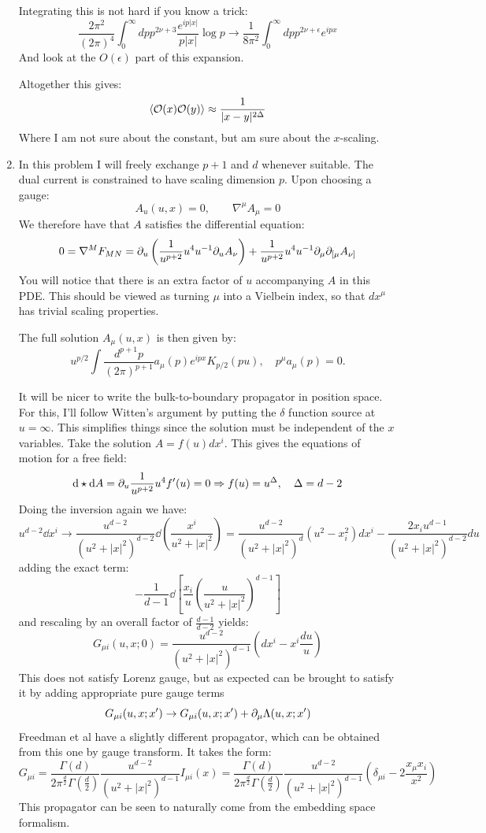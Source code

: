 \documentclass[11pt, class=article, crop=false]{standalone}
\begin{document}
\begin{enumerate}
	Integrating this is not hard if you know a trick:
	\[
		\frac{2 \pi^2}{(2\pi)^4} \int_0^\infty dp p^{2 \nu + 3} \frac{e^{i p |x|}}{p|x|} \log p \to \frac{1}{8\pi^2} \int_0^\infty dp p^{2 \nu + \epsilon} e^{i p x} 
	\]
	And look at the $O(\epsilon)$ part of this expansion. 
	
	Altogether this gives:
	\[
		\braket{\mathcal{O}(x) \mathcal{O}(y)} \approx \frac{1}{|x-y|^{2 \Delta}}
	\]
	Where I am not sure about the constant, but am sure about the $x$-scaling. %
	
	\item In this problem I will freely exchange $p+1$ and $d$ whenever suitable. The dual current is constrained to have scaling dimension $p$. Upon choosing a gauge:
	\[
		A_u(u, x) = 0, \qquad \nabla^\mu A_\mu = 0
	\]
	We therefore have that $A$ satisfies the differential equation:
	\[
		0 = \nabla^M F_{MN} = \partial_u \left(\frac{1}{u^{p+2}} u^4 u^{-1} \partial_u A_\nu \right) + \frac{1}{u^{p+2}} u^4 u^{-1} \partial_\mu \partial_{[\mu} A_{\nu]}
	\]
	You will notice that there is an extra factor of $u$ accompanying $A$ in this PDE. This should be viewed as turning $\mu$ into a Vielbein index, so that $dx^\mu$ has trivial scaling properties. 
	
	The full solution $A_\mu (u, x)$ is then given by:
	\[
		u^{p/2} \int \frac{d^{p+1} p}{(2\pi)^{p+1}} a_\mu (p) e^{i p x} K_{p/2}(p u), \quad p^\mu a_\mu(p) = 0.
	\]
	
	
	It will be nicer to write the bulk-to-boundary propagator in position space. For this, I'll follow Witten's argument by putting the $\delta$ function source at $u = \infty$. This simplifies things since the solution must be independent of the $x$ variables. Take the solution $A= f(u) dx^i$. This gives the equations of motion for a free field:
	\[
		\mathrm{d} \star \mathrm{d} A = \partial_u \frac{1}{u^{p+2}} u^4 f'(u) = 0 \Rightarrow f(u) = u^\Delta, \quad \Delta = d-2
	\]
	Doing the inversion again we have:
	\[
		u^{d-2} \dd x^i \to \frac{u^{d-2}}{(u^2 + |x|^2)^{d-2}} \dd\left(\frac{x^i}{u^2 + |x|^2} \right)=  \frac{u^{d-2}}{(u^2 + |x|^2)^{d}} (u^2 - x_i^2) dx^i - \frac{2 x_i u^{d-1}}{(u^2 + |x|^2)^{d-2}} du
	\]
	adding the exact term:
	\[
		- \frac{1}{d-1} \dd \left[\frac{x_i}{u} \left(\frac{u}{u^2 + |x|^2} \right)^{d-1} \right]
	\]
	and rescaling by an overall factor of $\frac{d-1}{d-2}$ yields:
	\begin{equation}\label{eq:vectorprop}
		G_{\mu i}(u, x; 0) = \frac{u^{d-2}}{(u^2 + |x|^2)^{d-1}} \left(dx^i - x^i \frac{du}{u} \right)
	\end{equation}
	This does not satisfy Lorenz gauge, but as expected can be brought to satisfy it by adding appropriate pure gauge terms
	\[
		G_{\mu i}(u, x; x') \to G_{\mu i}(u, x; x') + \partial_\mu \Lambda(u, x; x')
	\]
	Freedman et al have a slightly different propagator, which can be obtained from this one by gauge transform. It takes the form:
	\[
		G_{\mu i} = \frac{ \Gamma(d)}{2\pi^{\frac d2} \Gamma(\frac d2)} \frac{u^{d-2}}{(u^2 + |x|^2)^{d-1}} I_{\mu i}(x) 
		= \frac{ \Gamma(d)}{2\pi^{\frac d2} \Gamma(\frac d2)} \frac{u^{d-2}}{(u^2 + |x|^2)^{d-1}} \left(\delta_{\mu i} - 2 \frac{x_\mu x_i}{x^2} \right)
	\]
	This propagator can be seen to naturally come from the embedding space formalism. 
	

\end{enumerate}
\end{document}
